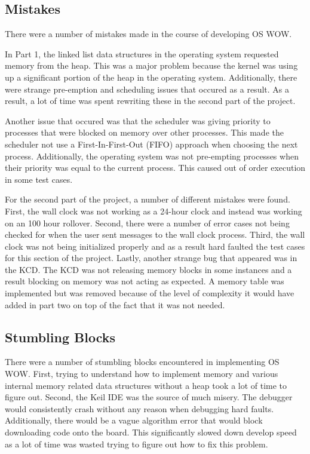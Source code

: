 \documentclass[se]{uw-wkrpt}
\begin{document}
\subsection{Mistakes}

There were a number of mistakes made in the course of developing OS WOW.

In Part 1, the linked list data structures in the operating system requested memory from the heap. This was a major problem because the kernel was using up a significant portion of the heap in the operating system. Additionally, there were strange pre-emption and scheduling issues that occured as a result. As a result, a lot of time was spent rewriting these in the second part of the project.

Another issue that occured was that the scheduler was giving priority to processes that were blocked on memory over other processes. This made the scheduler not use a First-In-First-Out (FIFO) approach when choosing the next process. Additionally, the operating system was not pre-empting processes when their priority was equal to the current process. This caused out of order execution in some test cases.

For the second part of the project, a number of different mistakes were found. First, the wall clock was not working as a 24-hour clock and instead was working on an 100 hour rollover. Second, there were a number of error cases not being checked for when the user sent messages to the wall clock process. Third, the wall clock was not being initialized properly and as a result hard faulted the test cases for this section of the project. Lastly, another strange bug that appeared was in the KCD. The KCD was not releasing memory blocks in some instances and a result blocking on memory was not acting as expected. A memory table was implemented but was removed because of the level of complexity it would have added in part two on top of the fact that it was not needed.

\subsection{Stumbling Blocks}

There were a number of stumbling blocks encountered in implementing OS WOW. First, trying to understand how to implement memory and various internal memory related data structures without a heap took a lot of time to figure out. Second, the Keil IDE was the source of much misery. The debugger would consistently crash without any reason when debugging hard faults. Additionally, there would be a vague algorithm error that would block downloading code onto the board. This significantly slowed down develop speed as a lot of time was wasted trying to figure out how to fix this problem. 
\end{document}
